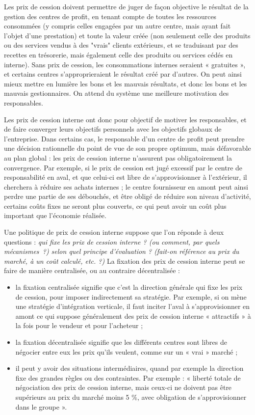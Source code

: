 \documentclass[oneside]{kaobook}
\begin{document}
Les prix de cession doivent permettre de juger de façon objective le résultat de la gestion des centres de profit, en tenant compte de toutes les ressources consommées (y compris celles engagées par un autre centre, mais ayant fait l’objet d’une prestation) et toute la valeur créée (non seulement celle des produits ou des services vendus à des "vrais" clients extérieurs, et se traduisant par des recettes en trésorerie, mais également celle des produits ou services cédés en interne). Sans prix de cession, les consommations internes seraient « gratuites », et certains centres s’approprieraient le résultat créé par d’autres. On peut ainsi mieux mettre en lumière les bons et les mauvais résultats, et donc les bons et les mauvais gestionnaires. On attend du système une meilleure motivation des responsables.

Les prix de cession interne ont donc pour objectif de motiver les responsables, et de faire converger leurs objectifs personnels avec les objectifs globaux de l’entreprise. Dans certains cas, le responsable d’un centre de profit peut prendre une décision rationnelle du point de vue de son propre optimum, mais défavorable au plan global : les prix de cession interne n’assurent pas obligatoirement la convergence. Par exemple, si le prix de cession est jugé excessif par le centre de responsabilité en aval, et que celui-ci est libre de s’approvisionner à l’extérieur, il cherchera à réduire ses achats internes ; le centre fournisseur en amont peut ainsi perdre une partie de ses débouchés, et être obligé de réduire son niveau d’activité, certains coûts fixes ne seront plus couverts, ce qui peut avoir un coût plus important que l'économie réalisée.

Une politique de prix de cession interne suppose que l’on réponde à deux questions : \emph{qui fixe les prix de cession interne ? (ou comment, par quels mécanismes ?) selon quel principe d’évaluation ? (fait-on référence au prix du marché, à un coût calculé, etc. ?)}
La fixation des prix de cession interne peut se faire de manière centralisée, ou au contraire décentralisée :
\begin{itemize}
\item la fixation centralisée signifie que c’est la direction générale qui fixe les prix de cession, pour imposer indirectement sa stratégie. Par exemple, si on mène une stratégie d’intégration verticale, il faut inciter l’aval à s’approvisionner en amont ce qui suppose généralement des prix de cession interne « attractifs » à la fois pour le vendeur et pour l’acheteur ;
\item la fixation décentralisée signifie que les différents centres sont libres de négocier entre eux les prix qu’ils veulent, comme sur un « vrai » marché ;
\item il peut y avoir des situations intermédiaires, quand par exemple la direction fixe des grandes règles ou des contraintes. Par exemple : « liberté totale de négociation des prix de cession interne, mais ceux-ci ne doivent pas être supérieurs au prix du marché moins 5 \%, avec obligation de s’approvisionner dans le groupe ».
\end{itemize}
\end{document}

